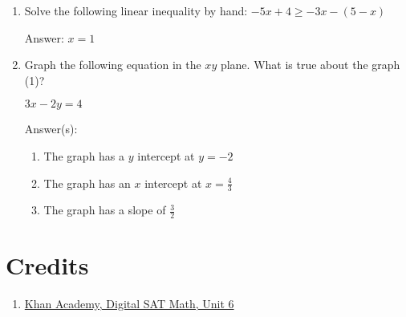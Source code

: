 \documentclass{article}
\begin{document}
\begin{enumerate}
{	      Answer: Quadrant III
	      }

	\item {Solve the following linear inequality by hand:
	      \(-5x+4\geq-3x-(5-x)\)

	      Answer: $x=1$}

	\item {Graph the following equation in the $xy$ plane. What is true about the graph (1)?

	      \(3x-2y=4\)

	      Answer(s): \begin{enumerate}
		      \item{The graph has a $y$ intercept at $y=-2$}
		      \item{The graph has an $x$ intercept at $x=\frac{4}{3}$}
		      \item{The graph has a slope of $\frac{3}{2}$}
	      \end{enumerate}}

\end{enumerate}

\section{Credits}
\begin{enumerate}

	\item{
	      \href{https://www.khanacademy.org/test-prep/v2-sat-math/x0fcc98a58ba3bea7:algebra-medium}{Khan Academy, Digital SAT Math, Unit 6}}

\end{enumerate}
\end{document}
